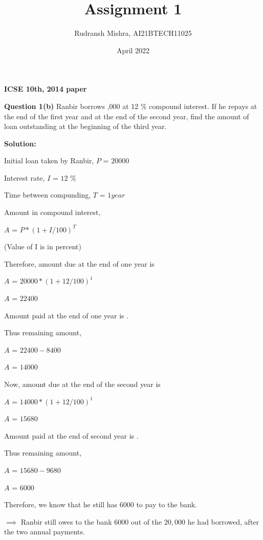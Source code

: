 \documentclass[article,12pt,twocolumn]{IEEEtran}
\begin{document}
 

\title{Assignment 1}
\author{Rudransh Mishra, AI21BTECH11025}
\date{April 2022}
\maketitle

\textbf{ICSE 10th, 2014 paper}


\hfill

\textbf{Question 1(b)} 
Ranbir borrows ,000 at 12 \% compound interest. If he repays  at the end of the first year and  at the end of the second year, find the amount of loan outstanding at the beginning of the third year.

\hfill \break
\textbf{Solution:}

Initial loan taken by Ranbir, $P$ = \rupee $20000$

Interest rate, $I$ = $12 $ $\%$

Time between compunding, $T$ = $1 year $

\hfill

Amount in compound interest, 

\hfill

$A$ = $ P * (1+I/100)^T $ 

\hfill

(Value of I is in percent)

\hfill

Therefore, amount due at the end of one year is 

\hfill

$A$ = $20000 * (1+12/100)^1 $

$A$ = \rupee $22400$

\hfill

Amount paid at the end of one year is .

Thus remaining amount,

\hfill

$A$ = $22400-8400$

$A$ = \rupee $14000$

\hfill

Now, amount due at the end of the second year is 

\hfill

$A$ = $14000 * (1+12/100)^1 $

$A$ = \rupee $15680$

\hfill

Amount paid at the end of second year is .


Thus remaining amount,

\hfill

$A$ = $15680-9680$

$A$ = \rupee $6000$

\hfill

\hfill

\hfill

\hfill

Therefore, we know that he still has \rupee $6000$ to pay to the bank.

\hfill

$\implies$ Ranbir still owes to the bank \rupee $6000$ out of the \rupee $20,000$ he had borrowed, after the two annual payments.
\end{document}
